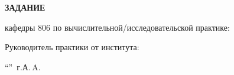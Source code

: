 \begin{center}
\bfseries{\large ЗАДАНИЕ}
\end{center}

кафедры 806 по вычислительной/исследовательской практике:

\vspace*{\fill}
Руководитель практики от института:

\vspace{5pt}
\enquote{\hspace{0.5cm}}  \the\year\,г. А.\,A. 
\pagebreak
